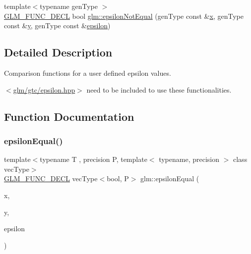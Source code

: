 \begin{DoxyCompactItemize}
\item 
{\footnotesize template$<$typename gen\+Type $>$ }\\\mbox{\hyperlink{setup_8hpp_ab2d052de21a70539923e9bcbf6e83a51}{G\+L\+M\+\_\+\+F\+U\+N\+C\+\_\+\+D\+E\+CL}} bool \mbox{\hyperlink{group__gtc__epsilon_ga50a92103fb0cbd796908e1bf20c79aaf}{glm\+::epsilon\+Not\+Equal}} (gen\+Type const \&\mbox{\hyperlink{glad_8h_a92d0386e5c19fb81ea88c9f99644ab1d}{x}}, gen\+Type const \&\mbox{\hyperlink{glad_8h_a66ddd433d2cacfe27f5906b7e86faeed}{y}}, gen\+Type const \&\mbox{\hyperlink{group__gtc__constants_ga2a1e57fc5592b69cfae84174cbfc9429}{epsilon}})
\end{DoxyCompactItemize}


\subsection{Detailed Description}
Comparison functions for a user defined epsilon values. 

$<$\mbox{\hyperlink{epsilon_8hpp}{glm/gtc/epsilon.\+hpp}}$>$ need to be included to use these functionalities. 

\subsection{Function Documentation}
\mbox{\label{group__gtc__epsilon_gaca9443f217dc36587624247245522331}} 
\subsubsection{\texorpdfstring{epsilonEqual()}{epsilonEqual()}\hspace{0.1cm}{\footnotesize\ttfamily [1/2]}}
{\footnotesize\ttfamily template$<$typename T , precision P, template$<$ typename, precision $>$ class vec\+Type$>$ \\
\mbox{\hyperlink{setup_8hpp_ab2d052de21a70539923e9bcbf6e83a51}{G\+L\+M\+\_\+\+F\+U\+N\+C\+\_\+\+D\+E\+CL}} vec\+Type$<$bool, P$>$ glm\+::epsilon\+Equal (\begin{DoxyParamCaption}\item[{vec\+Type$<$ T, P $>$ const \&}]{x,  }\item[{vec\+Type$<$ T, P $>$ const \&}]{y,  }\item[{T const \&}]{epsilon }\end{DoxyParamCaption})}

